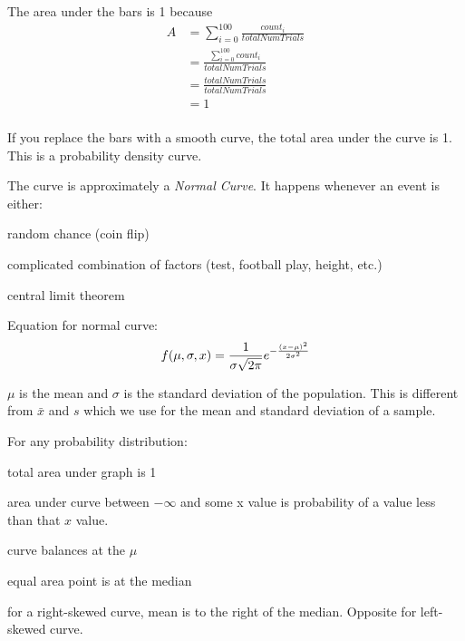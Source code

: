 \documentclass[landscape]{exam}
\begin{document}
  The area under the bars is 1 because
  \begin{align*}
    A & = \sum_{i = 0}^{100} \frac{count_i}{totalNumTrials} \\
      & = \frac{\sum_{i = 0}^{100} count_i}{totalNumTrials} \\
      & = \frac{totalNumTrials}{totalNumTrials} \\
      & = 1 \\
  \end{align*}

  If you replace the bars with a smooth curve, the total area under the curve is
  1. This is a probability density curve.

  The curve is approximately a {\em Normal Curve}.  It happens whenever an event
  is either:
  \begin{itemize*}
    \item random chance (coin flip)
    \item complicated combination of factors (test, football play, height, etc.)
    \item central limit theorem
  \end{itemize*}

  Equation for normal curve:
  \[
    f(\mu, \sigma, x) = \frac{1}{\sigma\sqrt{2\pi}} e^{ -\frac{\del{ x-\mu }^2}{2\sigma^2} }
  \]

  $\mu$ is the mean and $\sigma$ is the standard deviation of the
  population. This is different from $\bar{x}$ and $s$ which we use for the mean
  and standard deviation of a sample.

  For any probability distribution:
  \begin{itemize*}
    \item total area under graph is 1

    \item area under curve between $-\infty$ and some x value is probability of
      a value less than that $x$ value.

    \item curve balances at the $\mu$

    \item equal area point is at the median

    \item for a right-skewed curve, mean is to the right of the median. Opposite
      for left-skewed curve.
  \end{itemize*}
\end{document}
